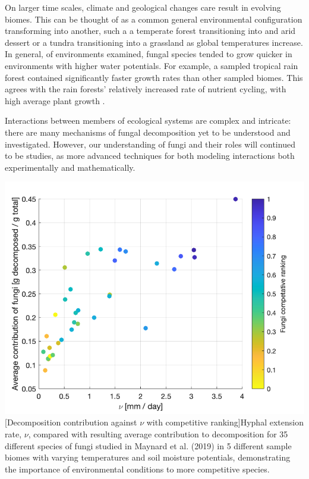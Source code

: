 \documentclass[12pt]{article}
\begin{document}
On larger time scales, climate and geological changes care result in evolving biomes. This can be thought of as a common general environmental configuration transforming into another, such a a temperate forest transitioning into and arid dessert or a tundra transitioning into a grassland as global temperatures increase. In general, of environments examined, fungal species tended to grow quicker in environments with higher water potentials. For example, a sampled tropical rain forest contained significantly faster growth rates than other sampled biomes. This agrees with the rain forests' relatively increased rate of nutrient cycling, with high average plant growth \cite{Lodge1993}.

Interactions between members of ecological systems are complex and intricate: there are many mechanisms of fungal decomposition yet to be understood and investigated. However, our understanding of fungi and their roles will continued to be studies, as more advanced techniques for both modeling interactions both experimentally and mathematically.

\begin{center}\label{Competitive Distribution Coefficients in article}
	\includegraphics[width=\linewidth]{avg_contr_nu_competative_rankings.png}
	[Decomposition contribution against $\nu$ with competitive ranking]{Hyphal extension rate, $\nu$, compared with resulting average contribution to decomposition for 35 different species of fungi studied in Maynard et al. (2019) in 5 different sample biomes with varying temperatures and soil moisture potentials, demonstrating the importance of environmental conditions to more competitive species.}
\end{center}

\newpage
\printbibliography
\end{document}
